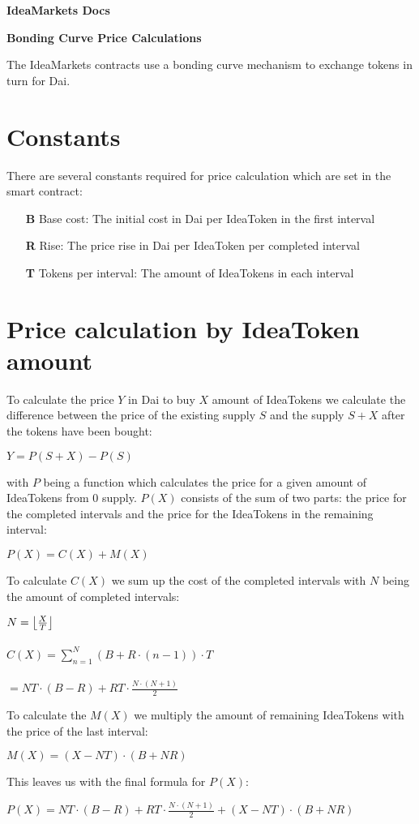 \documentclass[12pt]{article}
\DeclarePairedDelimiter\floor{\lfloor}{\rfloor}
\begin{document}
\begin{center}
\begin{huge}
\textbf{IdeaMarkets Docs}
\end{huge}
\linebreak\linebreak
\textbf{Bonding Curve Price Calculations}
\end{center}

The IdeaMarkets contracts use a bonding curve mechanism to exchange tokens in turn for Dai. 

\section{Constants}
There are several constants required for price calculation which are set in the smart contract:
\begin{itemize}
\item[\textbf{B}] Base cost: The initial cost in Dai per IdeaToken in the first interval
\item[\textbf{R}] Rise: The price rise in Dai per IdeaToken per completed interval
\item[\textbf{T}] Tokens per interval: The amount of IdeaTokens in each interval
\end{itemize}

\section{Price calculation by IdeaToken amount}
To calculate the price $Y$ in Dai to buy $X$ amount of IdeaTokens we calculate the difference between the price of the existing supply $S$ and the supply $S + X$ after the tokens have been bought:
\begin{center}
$Y = P(S + X) - P(S)$
\end{center}
with $P$ being a function which calculates the price for a given amount of IdeaTokens from $0$ supply. $P(X)$ consists of the sum of two parts: the price for the completed intervals and the price for the IdeaTokens in the remaining interval:
\begin{center}
$P(X) = C(X) + M(X)$
\end{center}
To calculate $C(X)$ we sum up the cost of the completed intervals with $N$ being the amount of completed intervals:
\begin{center}
$N = \floor*{\frac{X}{T}}$\\~\\
$C(X) = \sum\nolimits_{n=1}^{N}(B + R \cdot (n - 1)) \cdot T$ \\~\\
$= NT \cdot (B - R) + RT \cdot \frac{N \cdot (N + 1)}{2}$
\end{center}
\pagebreak
To calculate the $M(X)$ we multiply the amount of remaining IdeaTokens with the price of the last interval:
\begin{center}
$M(X) = (X - NT) \cdot (B + NR)$
\end{center}
This leaves us with the final formula for $P(X)$:
\begin{center}
$P(X) = NT \cdot (B - R) + RT \cdot \frac{N \cdot (N + 1)}{2} + (X - NT) \cdot (B + NR)$
\end{center}
\end{document}
